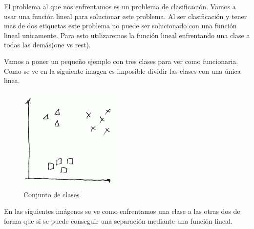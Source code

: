 \documentclass[titlepage]{article}
\begin{document}
El problema al que nos enfrentamos es un problema de clasificación. Vamos a usar una función lineal para solucionar este problema. Al ser clasificación y tener mas de dos etiquetas este problema no puede ser solucionado con una función lineal unicamente. Para esto utilizaremos la función lineal enfrentando una clase a todas las demás(one vs rest). 

Vamos a poner un pequeño ejemplo con tres clases para ver como funcionaria. Como se ve en la siguiente imagen es imposible dividir las clases con una única linea. 
\begin{figure}[H]
	\centering
	\includegraphics[width=0.7\linewidth]{screenshot002}
	\caption{Conjunto de clases}
	\label{fig:screenshot002}
\end{figure}

En las siguientes imágenes se ve como enfrentamos una clase a las otras dos de forma que si se puede conseguir una separación mediante una función lineal.
\end{document}
